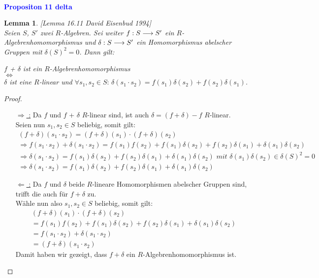 \documentclass[10pt,a4paper]{report}
\newcommand{\ModulsOfDifferenzials}{David Eisenbud 1994}
\newcounter{Aussage}[chapter]
\newtheorem{lemma}[Aussage]{Lemma}
\newcommand{\functionfront}[3]{\nolinebreak{#1:#2 \longrightarrow #3}}
\begin{document}
\ \\
\textcolor{blue}{\textbf{Propositon 11 delta}}
\begin{lemma}\label{Propositon 11 delta} \textit{[Lemma 16.11 \ModulsOfDifferenzials]} \\
Seien $S$, $S'$ zwei $R$-Algebren. Sei weiter $\functionfront{f}{S}{S'}$ ein $R$-Algebrenhomomorphismus und $\functionfront{\delta}{S}{S'}$ ein Homomorphismus abelscher Gruppen mit $\delta(S)^2 = 0$. Dann gilt:
\begin{center}
$f$ + $\delta$ ist ein $R$-Algebrenhomomorphismus\\
$\Leftrightarrow$\\
$\delta$ ist eine $R$-linear und $\forall s_1,s_2 \in S :\, \delta(s_1 \cdot s_2) = f(s_1)\delta(s_2) + f(s_2)\delta(s_1)$.
\end{center}
\end{lemma}
\begin{proof} \ \\
\begin{itemize}
\item[\underline{\glqq $\Rightarrow$ \grqq :}] Da $f$ und $f$ + $\delta$ $R$-linear sind, ist auch $\delta = (f + \delta) - f$ $R$-linear.\\
Seien nun $s_1,s_2 \in S$ beliebig, somit gilt:
\begin{gather*}
(f + \delta)(s_1 \cdot s_2) = (f + \delta)(s_1) \cdot (f + \delta)(s_2)\\
\Rightarrow f(s_1 \cdot s_2) + \delta(s_1 \cdot s_2) = f(s_1)f(s_2) + f(s_1)\delta(s_2) + f(s_2)\delta(s_1) + \delta(s_1)\delta(s_2)\\
\Rightarrow \delta(s_1 \cdot s_2) = f(s_1)\delta(s_2) + f(s_2)\delta(s_1) + \delta(s_1)\delta(s_2) \textit{ mit } \delta(s_1)\delta(s_2) \in \delta(S)^2 = 0 \\
\Rightarrow \delta(s_1 \cdot s_2) = f(s_1)\delta(s_2) + f(s_2)\delta(s_1) + \delta(s_1)\delta(s_2)
\end{gather*}
\item[\underline{\glqq $\Leftarrow$ \grqq :}]
Da $f$ und $\delta$ beide $R$-lineare Homomorphismen abelscher Gruppen sind, trifft die auch für $f + \delta$ zu.\\
Wähle nun also $s_1,s_2 \in S$ beliebig, somit gilt:
\begin{gather*}
(f + \delta)(s_1) \cdot (f + \delta)(s_2) \\
= f(s_1)f(s_2) + f(s_1)\delta(s_2) + f(s_2)\delta(s_1) + \delta(s_1)\delta(s_2)\\
= f(s_1 \cdot s_2) + \delta(s_1 \cdot s_2) \\
= (f + \delta)(s_1 \cdot s_2)
\end{gather*}
Damit haben wir gezeigt, dass $f + \delta$ ein $R$-Algebrenhomomorphismus ist.
\end{itemize}
\end{proof}
\end{document}
